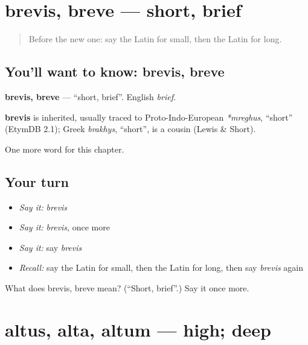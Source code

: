 \section[brevis, breve]{brevis, breve — short, brief}

\label{lesson:LA-C93-brevis}



\begin{quote}
Before the new one: say the Latin for small, then the Latin for long.
\end{quote}

\subsection*{You'll want to know: brevis, breve}
\textbf{brevis, breve} — \textquotedblleft{}short, brief\textquotedblright{}. English \emph{brief}.

\begin{cousinweb}
\textbf{brevis} is inherited, usually traced to Proto-Indo-European \emph{*mreghus}, \textquotedblleft{}short\textquotedblright{} (EtymDB 2.1); Greek \emph{brakhys}, \textquotedblleft{}short\textquotedblright{}, is a cousin (Lewis \& Short).
\end{cousinweb}

\begin{grammarlens}[title={What you've built}]
One more word for this chapter.
\end{grammarlens}

\subsection*{Your turn}
\begin{itemize}
\raggedright
  \item \emph{Say it:} \emph{brevis}
  \item \emph{Say it:} \emph{brevis}, once more
  \item \emph{Say it:} say \emph{brevis}
  \item \emph{Recall:} say the Latin for small, then the Latin for long, then say \emph{brevis} again
\end{itemize}

\begin{tcolorbox}[breakable,colback=teal!4,colframe=teal!35!black,title={Before you move on}]
What does brevis, breve mean? (\textquotedblleft{}Short, brief\textquotedblright{}.) Say it once more.
\end{tcolorbox}
\section[altus, alta, altum]{altus, alta, altum — high; deep}

